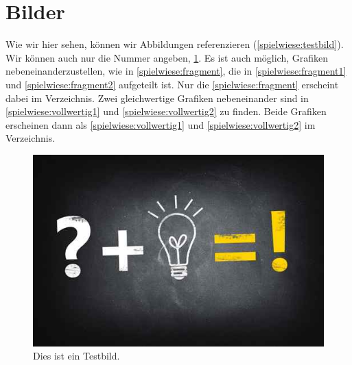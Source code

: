 \section{Bilder}

Wie wir hier sehen, können wir Abbildungen referenzieren (\scvgl \autoref{spielwiese:testbild}).
Wir können auch nur die Nummer angeben, \sczb \ref{spielwiese:testbild}.
Es ist auch möglich, Grafiken nebeneinanderzustellen, wie \sczb in \autoref{spielwiese:fragment}, die in \autoref{spielwiese:fragment1} und \autoref{spielwiese:fragment2} aufgeteilt ist.
Nur die \ref{spielwiese:fragment} erscheint dabei im Verzeichnis.
Zwei gleichwertige Grafiken nebeneinander sind in \autoref{spielwiese:vollwertig1} und \autoref{spielwiese:vollwertig2} zu finden.
Beide Grafiken erscheinen dann als \ref{spielwiese:vollwertig1} und \ref{spielwiese:vollwertig2} im Verzeichnis.

\begin{figure}[!ht]
	\centering
	\includegraphics[width=\textwidth]{images/test.jpg}  %
	\caption[Testbild]{Dies ist ein Testbild.}
	\label{spielwiese:testbild}
\end{figure}

